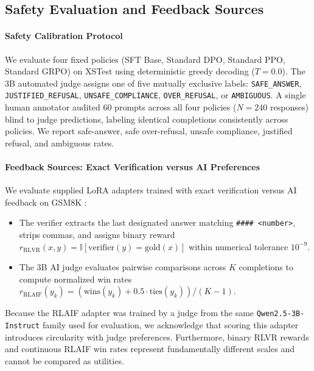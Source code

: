 \documentclass{article}
\begin{document}
\subsection{Safety Evaluation and Feedback Sources}
\label{sec:setup_safety_feedback}

\paragraph{Safety Calibration Protocol} We evaluate four fixed policies (SFT Base, Standard DPO, Standard PPO, Standard GRPO) on XSTest \citep{rottger2024xstest, bianchi2024safetytuned, bai2022constitutional} using deterministic greedy decoding ($T = 0.0$). The 3B automated judge assigns one of five mutually exclusive labels: \texttt{SAFE\_ANSWER}, \texttt{JUSTIFIED\_REFUSAL}, \texttt{UNSAFE\_COMPLIANCE}, \texttt{OVER\_REFUSAL}, or \texttt{AMBIGUOUS}. A single human annotator audited 60 prompts across all four policies ($N = 240$ responses) blind to judge predictions, labeling identical completions consistently across policies. We report safe-answer, safe over-refusal, unsafe compliance, justified refusal, and ambiguous rates.

\paragraph{Feedback Sources: Exact Verification versus AI Preferences} We evaluate supplied LoRA adapters trained with exact verification versus AI feedback on GSM8K \citep{cobbe2021gsm8k, deepseekai2025r1, lee2024rlaif}:
\begin{itemize}
  \item The verifier extracts the last designated answer matching \texttt{\#\#\#\# <number>}, strips commas, and assigns binary reward $r_{\text{RLVR}}(x, y) = \mathbb{I}[\text{verifier}(y) = \text{gold}(x)]$ within numerical tolerance $10^{-9}$.
  \item The 3B AI judge evaluates pairwise comparisons across $K$ completions to compute normalized win rates $r_{\text{RLAIF}}(y_k) = (\text{wins}(y_k) + 0.5 \cdot \text{ties}(y_k)) / (K - 1)$.
\end{itemize}
Because the RLAIF adapter was trained by a judge from the same \texttt{Qwen2.5-3B-Instruct} family used for evaluation, we acknowledge that scoring this adapter introduces circularity with judge preferences. Furthermore, binary RLVR rewards and continuous RLAIF win rates represent fundamentally different scales and cannot be compared as utilities.
\end{document}
